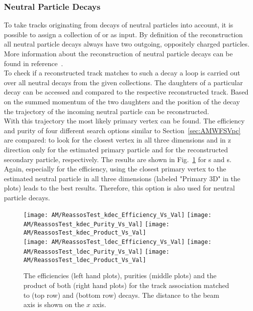 \subsubsection{Neutral Particle Decays \label{sec:AMWFSVnd}}
To take tracks originating from decays of neutral particles into account, it is possible to assign a collection of \PKzS{} or \PgL{} as input. By definition of the reconstruction all neutral particle decays always have two outgoing, oppositely charged particles. More information about the reconstruction of neutral particle decays can be found in reference~. \\
To check if a reconstructed track matches to such a decay a loop is carried out over all neutral decays from the given collections. The daughters of a particular decay can be accessed and compared to the respective reconstructed track. Based on the summed momentum of the two daughters and the position of the decay the trajectory of the incoming neutral particle can be reconstructed. \\
With this trajectory the most likely primary vertex can be found. The efficiency and purity of four different search options similar to Section~\ref{sec:AMWFSVpc} are compared: to look for the closest vertex in all three dimensions and in z direction only for the estimated primary particle and for the reconstructed secondary particle, respectively. The results are shown in Fig.~\ref{plot:AMWFSVdecEffAndPurSO} for  \PKzS{}s and \PgL{}s. Again, especially for the efficiency, using the closest primary vertex to the estimated neutral particle in all three dimensions (labeled "Primary 3D" in the plots) leads to the best results. Therefore, this option is also used for neutral particle decays.

\begin{figure}[Ht]
    \centering
    \texttt{[image: AM/ReassosTest\_kdec\_Efficiency\_Vs\_Val]}
    \texttt{[image: AM/ReassosTest\_kdec\_Purity\_Vs\_Val]}
    \texttt{[image: AM/ReassosTest\_kdec\_Product\_Vs\_Val]}
    \\
    \texttt{[image: AM/ReassosTest\_ldec\_Efficiency\_Vs\_Val]}
    \texttt{[image: AM/ReassosTest\_ldec\_Purity\_Vs\_Val]}
    \texttt{[image: AM/ReassosTest\_ldec\_Product\_Vs\_Val]}
    \caption[Efficiencies, purities and their product of the association using \PKzS{} and \PgL{} decays for different search options as a function of distance to the beam axis]{The efficiencies (left hand plots), purities (middle plots) and the product of both (right hand plots) for the track association matched to \PKzS{} (top row) and \PgL{} (bottom row) decays. The distance to the beam axis is shown on the $x$ axis.\label{plot:AMWFSVdecEffAndPurSO}}
\end{figure}

